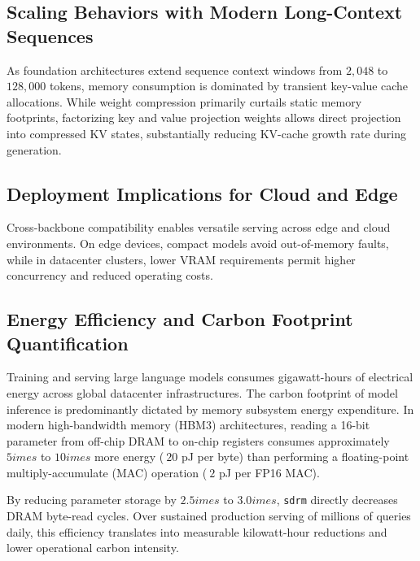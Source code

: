 \subsection{Scaling Behaviors with Modern Long-Context Sequences}
As foundation architectures extend sequence context windows from $2{,}048$ to $128{,}000$ tokens, memory consumption is dominated by transient key-value cache allocations. While weight compression primarily curtails static memory footprints, factorizing key and value projection weights allows direct projection into compressed KV states, substantially reducing KV-cache growth rate during generation.

\subsection{Deployment Implications for Cloud and Edge}
Cross-backbone compatibility enables versatile serving across edge and cloud environments. On edge devices, compact models avoid out-of-memory faults, while in datacenter clusters, lower VRAM requirements permit higher concurrency and reduced operating costs.

\subsection{Energy Efficiency and Carbon Footprint Quantification}
Training and serving large language models consumes gigawatt-hours of electrical energy across global datacenter infrastructures. The carbon footprint of model inference is predominantly dictated by memory subsystem energy expenditure. In modern high-bandwidth memory (HBM3) architectures, reading a 16-bit parameter from off-chip DRAM to on-chip registers consumes approximately $5	imes$ to $10	imes$ more energy ($~20$ pJ per byte) than performing a floating-point multiply-accumulate (MAC) operation ($~2$ pJ per FP16 MAC).

By reducing parameter storage by $2.5	imes$ to $3.0	imes$, \texttt{sdrm} directly decreases DRAM byte-read cycles. Over sustained production serving of millions of queries daily, this efficiency translates into measurable kilowatt-hour reductions and lower operational carbon intensity.
